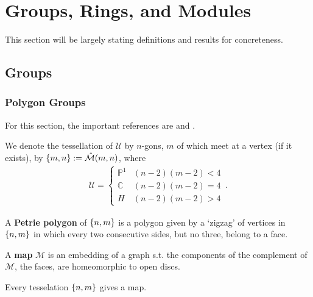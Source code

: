\documentclass{article}
\begin{document}
\section{Groups, Rings, and Modules}

This section will be largely stating definitions and results for concreteness. 
\subsection{Groups}

\subsubsection{Polygon Groups}
For this section, the important references are \cite{Singerman1997} and \cite{Coxeter1957}.

\begin{definition}
	We denote the tessellation of $\mathcal{U}$ by $n$-gons, $m$ of which meet at a vertex (if it exists), by $\left\{ m,n \right\} := \hat{\mathcal{M}}(m,n)$, where 
	\begin{align*}
	\mathcal{U} = \left \lbrace \begin{array}{cc}
		\mathbb{P}^1 & (n-2)(m-2)<4 \\
		\mathbb{C} & (n-2)(m-2) = 4 \\
		H & (n-2)(m-2) > 4
	\end{array}	\right . \, . 
	\end{align*}
\end{definition}

\begin{definition}
	A \textbf{Petrie polygon} of $\left\{ n,m \right\}$ is a polygon given by a `zigzag' of vertices in $\left\{ n,m \right\}$ in which every two consecutive sides, but no three, belong to a face. 
\end{definition}

\begin{definition}
	A \textbf{map} $\mathcal{M}$ is an embedding of a graph s.t. the components of the complement of $\mathcal{M}$, the faces, are homeomorphic to open discs.  
\end{definition}

\begin{example}
	Every tesselation $\left\{ n,m \right\}$ gives a map. 
\end{example}
\end{document}
